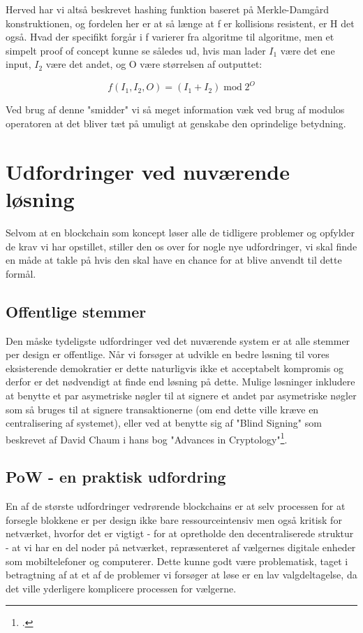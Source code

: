 \documentclass[a4paper, 8pt, oneside]{article} %
\begin{document}
Herved har vi altså beskrevet hashing funktion baseret på Merkle-Damgård konstruktionen, og fordelen her er at så længe at f er kollisions resistent, er H det også. Hvad der specifikt forgår i f varierer fra algoritme til algoritme, men et simpelt proof of concept kunne se således ud, hvis man lader $I_1$ være det ene input, $I_2$ være det andet, og O være størrelsen af outputtet:

\[f(I_1, I_2, O) = (I_1 + I_2) \; \textrm{mod} \; 2^O\]

Ved brug af denne "smidder" vi så meget information væk ved brug af modulos operatoren at det bliver tæt på umuligt at genskabe den oprindelige betydning.

\section{Udfordringer ved nuværende løsning}
Selvom at en blockchain som koncept løser alle de tidligere problemer og opfylder de krav vi har opstillet, stiller den os over for nogle nye udfordringer, vi skal finde en måde at takle på hvis den skal have en chance for at blive anvendt til dette formål.

\subsection{Offentlige stemmer}
Den måske tydeligste udfordringer ved det nuværende system er at alle stemmer per design er offentlige. Når vi forsøger at udvikle en bedre løsning til vores eksisterende demokratier er dette naturligvis ikke et acceptabelt kompromis og derfor er det nødvendigt at finde end løsning på dette. Mulige løsninger inkludere at benytte et par asymetriske nøgler til at signere et andet par asymetriske nøgler som så bruges til at signere transaktionerne (om end dette ville kræve en centralisering af systemet), eller ved at benytte sig af "Blind Signing" som beskrevet af David Chaum i hans bog "Advances in Cryptology"\footcite{chaum_advances_2012}.

\subsection{PoW - en praktisk udfordring}
En af de største udfordringer vedrørende blockchains er at selv processen for at forsegle blokkene er per design ikke bare ressourceintensiv men også kritisk for netværket, hvorfor det er vigtigt - for at opretholde den decentraliserede struktur - at vi har en del noder på netværket, repræsenteret af vælgernes digitale enheder som mobiltelefoner og computerer. Dette kunne godt være problematisk, taget i betragtning af at et af de problemer vi forsøger at løse er en lav valgdeltagelse, da det ville yderligere komplicere processen for vælgerne.
\end{document}
